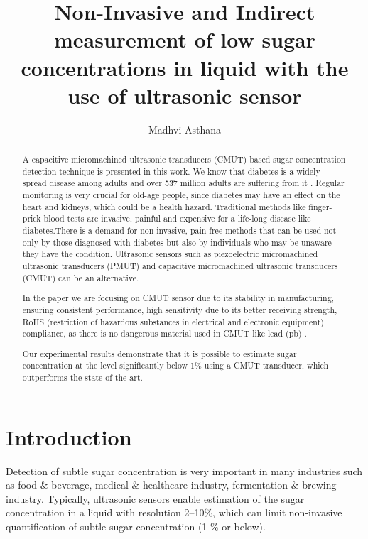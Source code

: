 \documentclass[runningheads]{llncs}
\title{Non-Invasive and Indirect measurement of low sugar concentrations in liquid with the use of ultrasonic sensor}
\author{Madhvi Asthana}
\institute{Brandenburg University of Technology, Cottbus-Senftenberg, Germany}
\begin{document}
\maketitle

\begin{abstract}

A capacitive micromachined ultrasonic transducers (CMUT) based sugar concentration detection technique is presented in this work. We know that diabetes is a widely spread disease among adults and over 537 million adults are suffering from it \cite{citation1}. Regular monitoring is very crucial for old-age people, since diabetes may have an effect on the heart and kidneys, which could be a health hazard. Traditional methods like finger-prick blood tests are invasive, painful and expensive for a life-long disease like diabetes.There is a demand for non-invasive, pain-free methods that can be used not only by those diagnosed with diabetes but also by individuals who may be unaware they have the condition. Ultrasonic sensors such as piezoelectric micromachined ultrasonic transducers (PMUT) and capacitive micromachined ultrasonic transducers (CMUT) can be an alternative.
\vspace{1em}  %

In the paper we are focusing on CMUT sensor due to its stability in manufacturing, ensuring consistent performance, high sensitivity due to its better receiving strength, RoHS (restriction of hazardous substances in electrical and electronic equipment) compliance, as there is no dangerous material used in CMUT like lead (pb) \cite{citation3}.
\vspace{1em}  %

Our experimental results demonstrate that it is possible to estimate sugar concentration at the level significantly below 1\% using a CMUT transducer, which outperforms the state-of-the-art.
\end{abstract}

\section{Introduction}
Detection of subtle sugar concentration is very important in many industries such as food \& beverage, medical \& healthcare industry, fermentation \& brewing industry. Typically, ultrasonic sensors enable estimation of the sugar concentration in a liquid with resolution 2--10\%, which can limit non-invasive quantification of subtle sugar concentration (1 \% or below). 
\vspace{1em}  %
\end{document}
